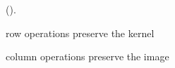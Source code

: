 \begin{comment}
    Looking back through the derivation, we see that the basis was obtained by applying [the parametric form method] to the system of equations corresponding to $(\rref(\AA) \xx = \mathbf{0} \text{ for all $\xx \in K^n$})$.

    Therefore,

    \begin{empheq}[box = \fbox]{align*}
        \text{The set of vectors obtained from applying [the parametric form method] to the equation} \\
        \text{($\rref(\AA) \xx = \mathbf{0}$  for all $\xx \in K^n$)} \\
        \text{ is a basis for $\ker(\AA)$}
    \end{empheq}
\end{deriv}
\end{comment}

\begin{theorem}
    ().
    
    row operations preserve the kernel

    column operations preserve the image
\end{theorem}


